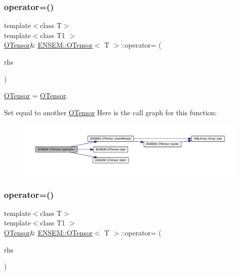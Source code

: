 \subsubsection{\texorpdfstring{operator=()}{operator=()}\hspace{0.1cm}{\footnotesize\ttfamily [7/8]}}
{\footnotesize\ttfamily template$<$class T$>$ \\
template$<$class T1 $>$ \\
\mbox{\hyperlink{classENSEM_1_1OTensor}{O\+Tensor}}\& \mbox{\hyperlink{classENSEM_1_1OTensor}{E\+N\+S\+E\+M\+::\+O\+Tensor}}$<$ T $>$\+::operator= (\begin{DoxyParamCaption}\item[{const \mbox{\hyperlink{classENSEM_1_1OTensor}{O\+Tensor}}$<$ T1 $>$ \&}]{rhs }\end{DoxyParamCaption})\hspace{0.3cm}{\ttfamily [inline]}}



\mbox{\hyperlink{classENSEM_1_1OTensor}{O\+Tensor}} = \mbox{\hyperlink{classENSEM_1_1OTensor}{O\+Tensor}}. 

Set equal to another \mbox{\hyperlink{classENSEM_1_1OTensor}{O\+Tensor}} Here is the call graph for this function\+:
\nopagebreak
\begin{figure}[H]
\begin{center}
\leavevmode
\includegraphics[width=350pt]{da/d8a/classENSEM_1_1OTensor_a96fac7277ac1df849789d53b761e5e68_cgraph}
\end{center}
\end{figure}
\mbox{\label{classENSEM_1_1OTensor_a96fac7277ac1df849789d53b761e5e68}} 
\subsubsection{\texorpdfstring{operator=()}{operator=()}\hspace{0.1cm}{\footnotesize\ttfamily [8/8]}}
{\footnotesize\ttfamily template$<$class T$>$ \\
template$<$class T1 $>$ \\
\mbox{\hyperlink{classENSEM_1_1OTensor}{O\+Tensor}}\& \mbox{\hyperlink{classENSEM_1_1OTensor}{E\+N\+S\+E\+M\+::\+O\+Tensor}}$<$ T $>$\+::operator= (\begin{DoxyParamCaption}\item[{const \mbox{\hyperlink{classENSEM_1_1OTensor}{O\+Tensor}}$<$ T1 $>$ \&}]{rhs }\end{DoxyParamCaption})\hspace{0.3cm}{\ttfamily [inline]}}



